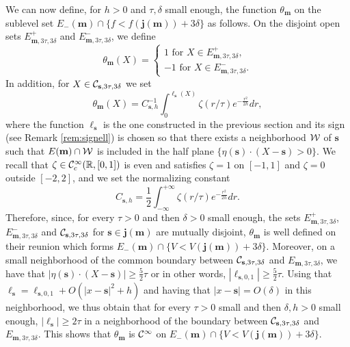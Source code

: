 \documentclass[12pt]{amsart}
\newcommand{\R}{\mathbb R}
\numberwithin{equation}{section}
\numberwithin{figure}{section}
\def\m{\mathbf{m}}
\def\s{\mathbf{s}}
\def\j{\mathbf{j}}
\begin{document}
We can now define, for $h>0$ and $\tau,\delta$ small enough, the function $\theta_\m$ on the sublevel set $E_-(\m)\cap\{f<f(\j(\m)) + 3\delta\}$ as follows. On the disjoint open sets $E^+_{\m,3\tau,3\delta}$ and $E^-_{\m,3\tau,3\delta}$, we define
\begin{equation*}
\theta_\m(X)=\left\{\begin{aligned}
    1\mbox{ for } X\in E^+_{\m,3\tau,3\delta},\\
    -1\mbox{ for } X\in E^-_{\m,3\tau,3\delta}.
\end{aligned}\right.
\end{equation*}
In addition, for $X\in\ccc_{\s,3\tau,3\delta}$ we set
\begin{equation*}
\theta_\m(X) = C_{\s,h}^{-1}\int_0^{\ell_\s(X)}\zeta(r/\tau)e^{-\frac{r^{2}}{2 h}}dr,
\end{equation*}
where the function $\ell_\s$ is the one constructed in the previous section and its sign (see Remark \ref{rem:signell}) is chosen so that there exists a neighborhood ${\mathcal W}$ of $\s$ such that $E(\m)\cap\www$ is included in the half plane $\{\eta(\s)\cdot(X - \s)>0\}$. We recall that $\zeta\in\ccc_c^\infty(\R,[0,1])$ is even and satisfies $\zeta = 1$ on $[-1,1]$ and $\zeta=0$ outside $[-2,2]$, and we set the normalizing constant
\begin{equation*}
C_{\s,h}=\frac 12\int_{-\infty}^{+\infty}\zeta(r/\tau)e^{-\frac{r^{2}}{2h}}dr.
\end{equation*}
Therefore, since, for every $\tau>0$ and then $\delta>0$ small enough, the sets $E^+_{\m,3\tau,3\delta}$, $E^-_{\m,3\tau,3\delta}$ and $\ccc_{\s,3\tau,3\delta}$ for $\s\in\j(\m)$ are mutually disjoint, $\theta_\m$ is well defined on their reunion which forms $E_-(\m)\cap\{V<V(\j(\m))+3\delta\}$. Moreover, on a small neighborhood of the common boundary between $\ccc_{\s,3\tau,3\delta}$ and $E_{\m,3\tau,3\delta}$, we have that $|\eta(\s)\cdot(X - \s)|\geq\frac52\tau$ or in other words, $|\ell_{\s,0,1}|\geq\frac52\tau$. Using that $\ell_\s = \ell_{\s,0,1} + O(|x-\s|^2 + h)$ and having that $|x-\s| = O(\delta)$ in this neighborhood, we thus obtain that for every $\tau > 0$ small and then $\delta,h>0$ small enough, $|\ell_\s| \geq 2\tau$ in a neighborhood of the boundary between $\ccc_{\s,3\tau,3\delta}$ and $E_{\m,3\tau,3\delta}$. This shows that $\theta_\m$ is ${\mathcal C}^\infty$ on $E_-(\m)\cap\{V<V(\j(\m))+3\delta\}$.
\end{document}
